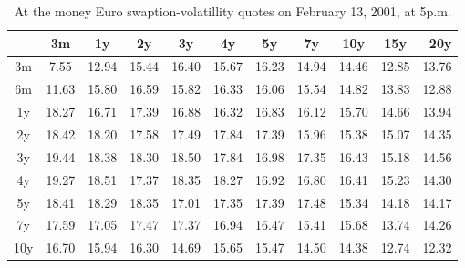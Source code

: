 \begin{adjustwidth}{-2em}{-2em}
\scriptsize

\begin{table}[H]
    \centering
\begin{tabular}{|c|c|c|c|c|c|c|c|c|c|r|}
  \hline
  &3m&1y&2y&3y&4y&5y&7y&10y&15y&20y\\
  \hline

3m& 7.55 & 12.94 & 15.44 & 16.40 & 15.67 & 16.23 & 14.94 & 14.46 & 12.85 & 13.76\\
6m & 11.63 & 15.80 & 16.59 & 15.82 & 16.33 & 16.06 & 15.54 & 14.82 & 13.83 & 12.88\\
1y& 18.27 & 16.71 & 17.39 & 16.88 & 16.32 & 16.83 & 16.12 & 15.70 & 14.66 & 13.94\\
2y&18.42 & 18.20 & 17.58 & 17.49 & 17.84 & 17.39 & 15.96 & 15.38 & 15.07 & 14.35\\
3y&19.44 & 18.38 & 18.30 & 18.50 & 17.84 & 16.98 & 17.35 & 16.43 & 15.18 & 14.56\\
4y&19.27 & 18.51 & 17.37 & 18.35 & 18.27 & 16.92 & 16.80 & 16.41 & 15.23 & 14.30\\
5y&18.41 & 18.29 & 18.35 & 17.01 & 17.35 & 17.39 & 17.48 & 15.34 & 14.18 & 14.17\\
7y&17.59 & 17.05 & 17.47 & 17.37 & 16.94 & 16.47 & 15.41 & 15.68 & 13.74 & 14.26\\
10y&16.70 & 15.94 & 16.30 & 14.69 & 15.65 & 15.47 & 14.50 & 14.38 & 12.74 & 12.32\\
  \hline
\end{tabular}
\caption{At the money Euro swaption-volatillity quotes on February 13, 2001, at 5p.m.}
\end{table}
\end{adjustwidth}

